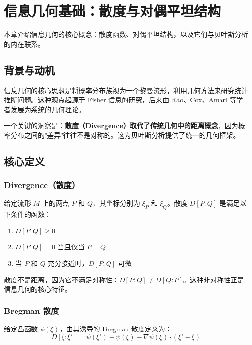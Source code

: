 \chapter{信息几何基础：散度与对偶平坦结构}\label{chap:ig-basics}

本章介绍信息几何的核心概念：散度函数、对偶平坦结构，以及它们与贝叶斯分析的内在联系。

\section{背景与动机}\label{sec:motivation}

信息几何的核心思想是将概率分布族视为一个黎曼流形，利用几何方法来研究统计推断问题。这种观点起源于 Fisher 信息的研究，后来由 Rao、Cox、Amari 等学者发展为系统的几何理论。

一个关键的洞察是：\textbf{散度（Divergence）取代了传统几何中的距离概念}，因为概率分布之间的"差异"往往不是对称的。这为贝叶斯分析提供了统一的几何框架。

\section{核心定义}\label{sec:definitions}

\subsection{Divergence（散度）}\label{def:divergence}

\begin{Definition}[散度]\label{def:divergence}
    给定流形 $M$ 上的两点 $P$ 和 $Q$，其坐标分别为 $\xi_P$ 和 $\xi_Q$。散度 $D[P:Q]$ 是满足以下条件的函数：
    \begin{enumerate}
        \item $D[P:Q] \geq 0$
        \item $D[P:Q] = 0$ 当且仅当 $P = Q$
        \item 当 $P$ 和 $Q$ 充分接近时，$D[P:Q]$ 可微
    \end{enumerate}
\end{Definition}

散度不是距离，因为它不满足对称性：$D[P:Q] \neq D[Q:P]$。这种非对称性正是信息几何的核心特征。

\subsection{Bregman 散度}\label{def:bregman}

\begin{Definition}[Bregman 散度]\label{def:bregman-divergence}
    给定凸函数 $\psi(\xi)$，由其诱导的 Bregman 散度定义为：
    \begin{equation}
        D[\xi:\xi'] = \psi(\xi') - \psi(\xi) - \nabla\psi(\xi) \cdot (\xi' - \xi)
    \end{equation}
\end{Definition}


